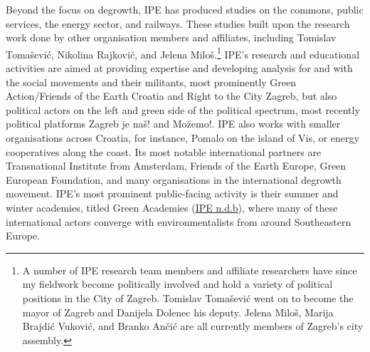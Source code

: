 \documentclass[a4paper, nobind]{templates/ociamthesis}
\begin{document}
Beyond the focus on degrowth, IPE has produced studies on the commons, public services, the energy sector, and railways. These studies built upon the research work done by other organisation members and affiliates, including Tomislav Tomašević, Nikolina Rajković, and Jelena Miloš.\footnote{A number of IPE research team members and affiliate researchers have since my fieldwork become politically involved and hold a variety of political positions in the City of Zagreb. Tomislav Tomašević went on to become the mayor of Zagreb and Danijela Dolenec his deputy. Jelena Miloš, Marija Brajdić Vuković, and Branko Ančić are all currently members of Zagreb's city assembly.} IPE's research and educational activities are aimed at providing expertise and developing analysis for and with the social movements and their militants, most prominently Green Action/Friends of the Earth Croatia and Right to the City Zagreb, but also political actors on the left and green side of the political spectrum, most recently political platforms Zagreb je naš! and Možemo!. IPE also works with smaller organisations across Croatia, for instance, Pomalo on the island of Vis, or energy cooperatives along the coast. Its most notable international partners are Transnational Institute from Amsterdam, Friends of the Earth Europe, Green European Foundation, and many organisations in the international degrowth movement. IPE's most prominent public-facing activity is their summer and winter academies, titled Green Academies (\protect\hyperlink{ref-ipe_green_}{IPE n.d.b}), where many of these international actors converge with environmentalists from around Southeastern Europe.
\end{document}
